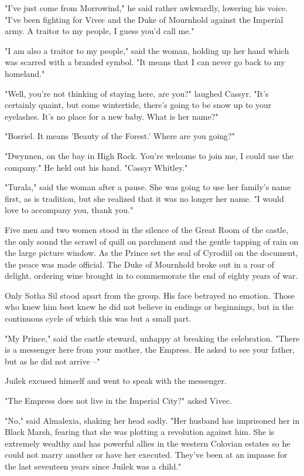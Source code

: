 "I've just come from Morrowind," he said rather awkwardly, lowering his voice. "I've been fighting for Vivec and the Duke of Mournhold against the Imperial army. A traitor to my people, I guess you'd call me."

"I am also a traitor to my people," said the woman, holding up her hand which was scarred with a branded symbol. "It means that I can never go back to my homeland."

"Well, you're not thinking of staying here, are you?" laughed Cassyr. "It's certainly quaint, but come wintertide, there's going to be snow up to your eyelashes. It's no place for a new baby. What is her name?"

"Bosriel. It means 'Beauty of the Forest.' Where are you going?"

"Dwynnen, on the bay in High Rock. You're welcome to join me, I could use the company." He held out his hand. "Cassyr Whitley."

"Turala," said the woman after a pause. She was going to use her family's name first, as is tradition, but she realized that it was no longer her name. "I would love to accompany you, thank you."

Five men and two women stood in the silence of the Great Room of the castle, the only sound the scrawl of quill on parchment and the gentle tapping of rain on the large picture window. As the Prince set the seal of Cyrodiil on the document, the peace was made official. The Duke of Mournhold broke out in a roar of delight, ordering wine brought in to commemorate the end of eighty years of war.

Only Sotha Sil stood apart from the group. His face betrayed no emotion. Those who knew him best knew he did not believe in endings or beginnings, but in the continuous cycle of which this was but a small part.

"My Prince," said the castle steward, unhappy at breaking the celebration. "There is a messenger here from your mother, the Empress. He asked to see your father, but as he did not arrive --"

Juilek excused himself and went to speak with the messenger.

"The Empress does not live in the Imperial City?" asked Vivec.

"No," said Almalexia, shaking her head sadly. "Her husband has imprisoned her in Black Marsh, fearing that she was plotting a revolution against him. She is extremely wealthy and has powerful allies in the western Colovian estates so he could not marry another or have her executed. They've been at an impasse for the last seventeen years since Juilek was a child."

